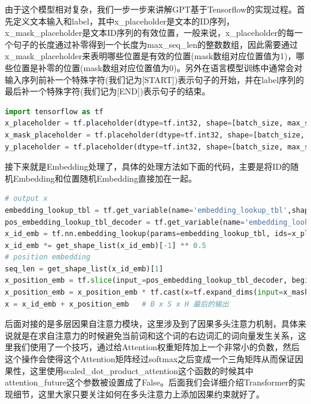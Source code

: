 \documentclass[twoside,a4paper,12pt]{book}%
\begin{document}
由于这个模型相对复杂，我们一步一步来讲解\gls{GPT}基于Tensorflow的实现过程。首先定义文本输入和label，其中x\_placeholder是文本的ID序列，x\_mask\_placeholder是文本ID序列的有效位置，一般来说，x\_placeholder的每一个句子的长度通过补零得到一个长度为max\_seq\_len的整数数组，因此需要通过x\_mask\_placeholder来表明哪些位置是有效的位置(mask数组对应位置值为1)，哪些位置是补零的位置(mask数组对应位置值为0)。另外在语言模型训练中通常会对输入序列前补一个特殊字符(我们记为[START])表示句子的开始，并在label序列的最后补一个特殊字符(我们记为[END])表示句子的结束。
\begin{lstlisting}[language={python}]
import tensorflow as tf
x_placeholder = tf.placeholder(dtype=tf.int32, shape=[batch_size, max_seq_len], name='x')
x_mask_placeholder = tf.placeholder(dtype=tf.int32, shape=[batch_size, max_seq_len], name='x_mask')
y_placeholder = tf.placeholder(dtype=tf.int32, shape=[batch_size, max_seq_len], name='y')
\end{lstlisting}
接下来就是Embedding处理了，具体的处理方法如下面的代码，主要是将ID的随机Embedding和位置随机Embedding直接加在一起。
\begin{lstlisting}[language={python}]
# output x
embedding_lookup_tbl = tf.get_variable(name='embedding_lookup_tbl',shape=[vocab_size,hidden_size],dtype=tf.float32,	initializer=tf.contrib.layers.xavier_initializer())
pos_embedding_lookup_tbl_decoder = tf.get_variable(name='embedding_lookup_tbl',shape=[max_pos_size,hidden_size],dtype=tf.float32,initializer=tf.contrib.layers.xavier_initializer())
x_id_emb = tf.nn.embedding_lookup(params=embedding_lookup_tbl, ids=x_placeholder)
x_id_emb *= get_shape_list(x_id_emb)[-1] ** 0.5
# position embedding
seq_len = get_shape_list(x_id_emb)[1]
x_position_emb = tf.slice(input_=pos_embedding_lookup_tbl_decoder, begin=[0, 0], size=[seq_len, -1])
x_position_emb = x_position_emb * tf.cast(x=tf.expand_dims(input=x_mask_placeholder, axis=-1), dtype=tf.float32)
x = x_id_emb + x_position_emb	# B x S x H 最后的输出
\end{lstlisting}
后面对接的是多层因果自注意力模块，这里涉及到了因果多头注意力机制，具体来说就是在求自注意力的时候避免当前词和这个词的右边词汇的词向量发生关系，这里我们使用了一个技巧，通过给Attention权重矩阵加上一个非常小的负数，然后这个操作会使得这个Attention矩阵经过softmax之后变成一个三角矩阵从而保证因果性，这里使用scaled\_dot\_product\_attention这个函数的时候其中attention\_future这个参数被设置成了False。后面我们会详细介绍Transformer的实现细节，这里大家只要关注如何在多头注意力上添加因果约束就好了。
\end{document}
